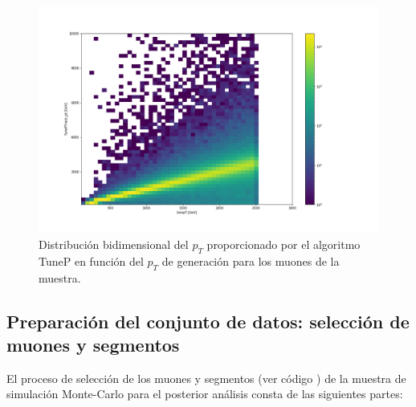 \begin{figure}[h!]
\centering
\includegraphics[width=1.0\textwidth]{figures/data_tunePpt_genpt.png}
\caption{Distribuci\'on bidimensional del $p_{T}$ proporcionado por el algoritmo TuneP en funci\'on del $p_{T}$ de generaci\'on para los muones de la muestra.}
\label{fig:data_recopt_genpt}  
\end{figure}



\subsection{Preparaci\'on del conjunto de datos: selecci\'on de muones y segmentos}\label{sec:selection}

El proceso de selecci\'on de los muones y segmentos (ver c\'odigo \cite{analyzer}) de la muestra de simulaci\'on Monte-Carlo para el posterior an\'alisis consta de las siguientes partes: 


